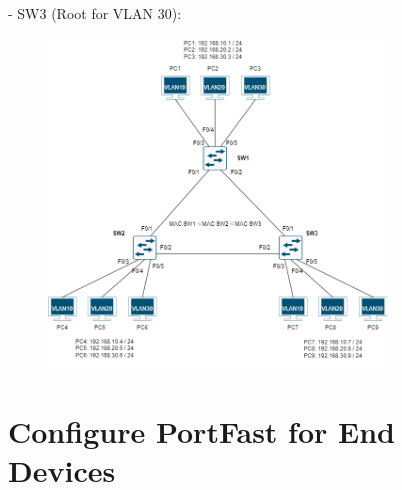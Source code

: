 \documentclass[a4paper]{book}
\begin{document}
\begin{enumerate}
    - SW3 (Root for VLAN 30):
    \begin{figure}[h]
        \centering
        \includegraphics[width=0.8\textwidth]{img/pvst01.png}
        \caption{\textit{}}
    \end{figure}
\end{enumerate}


\newpage

\section*{Configure PortFast for End Devices}
\end{document}
